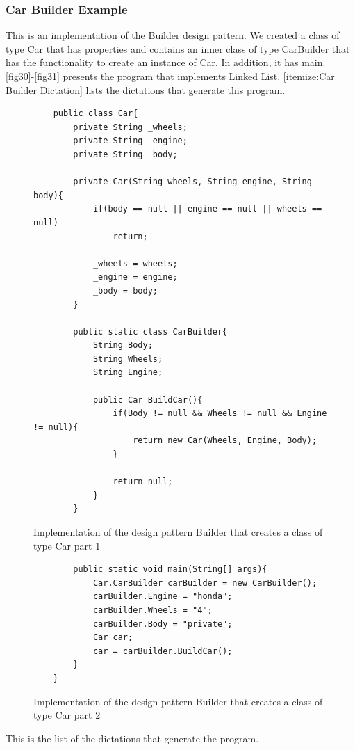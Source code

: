 \subsubsection{Car Builder Example}
This is an implementation of the Builder design pattern. We created a class of type Car that has properties and contains an inner class of type CarBuilder that has the functionality to create an instance of Car. In addition, it has main. \autoref{fig30}-\autoref{fig31} presents the program that implements Linked List. \autoref{itemize:Car Builder Dictation} lists the dictations that generate this program.
\begin{figure}[H]
	\begin{lstlisting}
	public class Car{
		private String _wheels;
		private String _engine;
		private String _body;
		
		private Car(String wheels, String engine, String body){
			if(body == null || engine == null || wheels == null)
				return;
			
			_wheels = wheels;
			_engine = engine;
			_body = body;
		}
		
		public static class CarBuilder{
			String Body;
			String Wheels;
			String Engine;
			
			public Car BuildCar(){
				if(Body != null && Wheels != null && Engine != null){
					return new Car(Wheels, Engine, Body);
				}
				
				return null;
			}
		}
	\end{lstlisting}
	\caption{Implementation of the design pattern Builder that creates a class of type Car part 1}
	\label{fig30}
\end{figure}
\begin{figure}[H]
	\begin{lstlisting}
		public static void main(String[] args){
			Car.CarBuilder carBuilder = new CarBuilder();
			carBuilder.Engine = "honda";
			carBuilder.Wheels = "4";
			carBuilder.Body = "private";
			Car car;
			car = carBuilder.BuildCar();
		}
	}
	\end{lstlisting}
	\caption{Implementation of the design pattern Builder that creates a class of type Car part 2}
	\label{fig31}
\end{figure}
This is the list of the dictations that generate the program.
